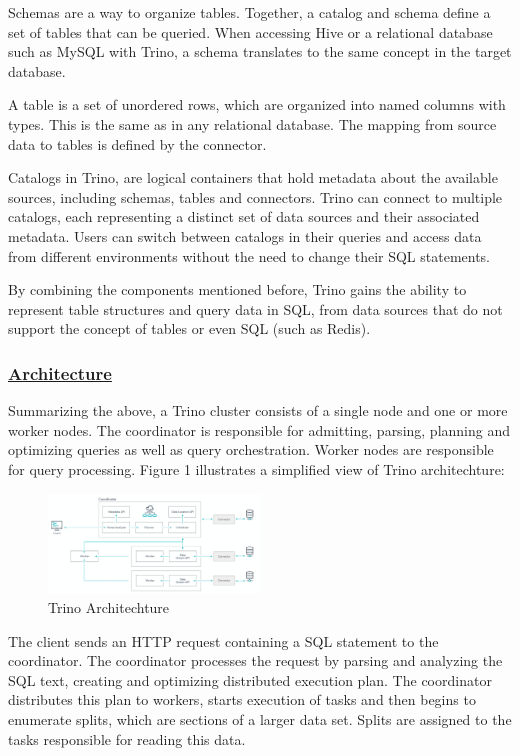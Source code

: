 \documentclass[conference]{IEEEtran}
\begin{document}
Schemas are a way to organize tables. Together, a catalog and schema define a set of tables that can be queried. When accessing Hive or a relational database such as MySQL with Trino,
a schema translates to the same concept in the target database.

A table is a set of unordered rows, which are organized into named columns with types. This is the same as in any relational database. The mapping from source data to tables is defined by the connector.

Catalogs in Trino, are logical containers that hold metadata about the available sources, including schemas, tables and connectors.
Trino can connect to multiple catalogs, each representing a distinct set of data sources and their associated metadata.
Users can switch between catalogs in their queries and access data from different environments without the need to change their SQL statements.

By combining the components mentioned before, Trino gains the ability to represent table structures and query data in SQL, from data sources that do not support the concept of tables or even SQL (such as Redis).

\subsubsection{\textbf{\underline{Architecture}}}

Summarizing the above, a Trino cluster consists of a single node and one or more worker nodes. The coordinator is responsible for admitting, parsing, planning and
optimizing queries as well as query orchestration. Worker nodes are responsible for query processing. Figure 1 illustrates a simplified view of Trino architechture:
\begin{figure}[h]
    \includegraphics[width=0.5\textwidth]{images/trino-architecture.png}
    \caption{Trino Architechture}
    \label{fig:trino_architechture}
\end{figure}


The client sends an HTTP request containing a SQL statement to the coordinator. The coordinator processes the request by parsing and analyzing the SQL text,
creating and optimizing distributed execution plan. The coordinator distributes this plan to workers, starts execution of tasks and then begins to enumerate splits,
which are sections of a larger data set. Splits are assigned to the tasks responsible for reading this data.
\end{document}
